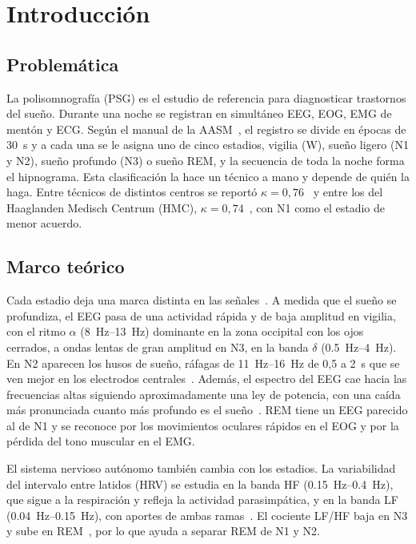 \section{Introducción}

\subsection{Problemática}
La polisomnografía (PSG) es el estudio de referencia para diagnosticar trastornos del sueño. Durante una noche se registran en simultáneo EEG, EOG, EMG de mentón y ECG. Según el manual de la AASM~\cite{berry2017}, el registro se divide en épocas de \SI{30}{\second} y a cada una se le asigna uno de cinco estadios, vigilia (W), sueño ligero (N1 y N2), sueño profundo (N3) o sueño REM, y la secuencia de toda la noche forma el hipnograma. Esta clasificación la hace un técnico a mano y depende de quién la haga. Entre técnicos de distintos centros se reportó $\kappa = 0{,}76$~\cite{dankerhopfe2009} y entre los del Haaglanden Medisch Centrum (HMC), $\kappa = 0{,}74$~\cite{alvarez2021}, con N1 como el estadio de menor acuerdo.

\subsection{Marco teórico}
Cada estadio deja una marca distinta en las señales~\cite{berry2017}. A medida que el sueño se profundiza, el EEG pasa de una actividad rápida y de baja amplitud en vigilia, con el ritmo $\alpha$ (\SIrange{8}{13}{\hertz}) dominante en la zona occipital con los ojos cerrados, a ondas lentas de gran amplitud en N3, en la banda $\delta$ (\SIrange{0,5}{4}{\hertz}). En N2 aparecen los husos de sueño, ráfagas de \SIrange{11}{16}{\hertz} de 0,5 a \SI{2}{\second} que se ven mejor en los electrodos centrales~\cite{molle2002}. Además, el espectro del EEG cae hacia las frecuencias altas siguiendo aproximadamente una ley de potencia, con una caída más pronunciada cuanto más profundo es el sueño~\cite{donoghue2020}. REM tiene un EEG parecido al de N1 y se reconoce por los movimientos oculares rápidos en el EOG y por la pérdida del tono muscular en el EMG.

El sistema nervioso autónomo también cambia con los estadios. La variabilidad del intervalo entre latidos (HRV) se estudia en la banda HF (\SIrange{0,15}{0,4}{\hertz}), que sigue a la respiración y refleja la actividad parasimpática, y en la banda LF (\SIrange{0,04}{0,15}{\hertz}), con aportes de ambas ramas~\cite{taskforce1996}. El cociente LF/HF baja en N3 y sube en REM~\cite{trinder2001}, por lo que ayuda a separar REM de N1 y N2.

